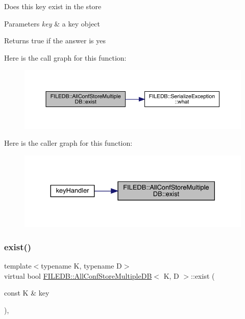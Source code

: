 Does this key exist in the store 
\begin{DoxyParams}{Parameters}
{\em key} & a key object \\
\hline
\end{DoxyParams}
\begin{DoxyReturn}{Returns}
true if the answer is yes 
\end{DoxyReturn}
Here is the call graph for this function\+:
\nopagebreak
\begin{figure}[H]
\begin{center}
\leavevmode
\includegraphics[width=350pt]{d5/dbe/classFILEDB_1_1AllConfStoreMultipleDB_a5c9333af45c37c53c863ad2a07a9843b_cgraph}
\end{center}
\end{figure}
Here is the caller graph for this function\+:
\nopagebreak
\begin{figure}[H]
\begin{center}
\leavevmode
\includegraphics[width=330pt]{d5/dbe/classFILEDB_1_1AllConfStoreMultipleDB_a5c9333af45c37c53c863ad2a07a9843b_icgraph}
\end{center}
\end{figure}
\mbox{\label{classFILEDB_1_1AllConfStoreMultipleDB_a5c9333af45c37c53c863ad2a07a9843b}} 
\subsubsection{\texorpdfstring{exist()}{exist()}\hspace{0.1cm}{\footnotesize\ttfamily [3/3]}}
{\footnotesize\ttfamily template$<$typename K, typename D$>$ \\
virtual bool \mbox{\hyperlink{classFILEDB_1_1AllConfStoreMultipleDB}{F\+I\+L\+E\+D\+B\+::\+All\+Conf\+Store\+Multiple\+DB}}$<$ K, D $>$\+::exist (\begin{DoxyParamCaption}\item[{const K \&}]{key }\end{DoxyParamCaption})\hspace{0.3cm}{\ttfamily [inline]}, {\ttfamily [virtual]}}

